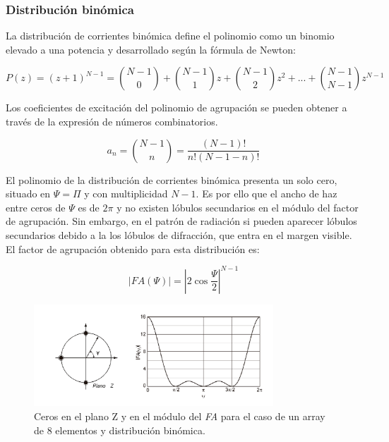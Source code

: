 \subsubsection{Distribución binómica}
\par La distribución de corrientes binómica define el polinomio como un binomio elevado a una potencia y desarrollado según la fórmula de Newton: \cite{Cardama2002}

\begin{equation}
	P(z)=(z+1)^{N-1}=\binom{N-1}{0}+\binom{N-1}{1}z+\binom{N-1}{2}z^{2}+...+\binom{N-1}{N-1}z^{N-1}
	\label{eq:newton}
\end{equation}

\par Los coeficientes de excitación del polinomio de agrupación se pueden obtener a través de la expresión de números combinatorios. \cite{Cardama2002}

\begin{equation}
	a_{n}=\binom{N-1}{n}=\frac{\left ( N-1 \right )!}{n!\left ( N-1-n \right )!}
	\label{eq:combinatorios}
\end{equation}

\par El polinomio de la distribución de corrientes binómica presenta un solo cero, situado en $\Psi=\Pi$ y con multiplicidad $N-1$. Es por ello que el ancho de haz entre ceros de $\Psi$ es de $2\pi$ y no existen lóbulos secundarios en el módulo del factor de agrupación. Sin embargo, en el patrón de radiación si pueden aparecer lóbulos secundarios debido a la los lóbulos de difracción, que entra en el margen visible. El factor de agrupación obtenido para esta distribución es: \cite{Cardama2002}

\begin{equation}
	\left | FA (\Psi) \right |=\left | 2\cos\frac{\Psi}{2} \right |^{N-1}	
	\label{eq:Fabinom}
\end{equation}

\begin{figure}[h]
    \centering
        \includegraphics[width=0.8\textwidth]{archivos/array/triangular}
        \caption{Ceros en el plano Z y en el módulo del \textit{FA} para el caso de un array de 8 elementos y distribución binómica. \citep{Cardama2002}}
        \label{fig:cerosbinom}
\end{figure}


